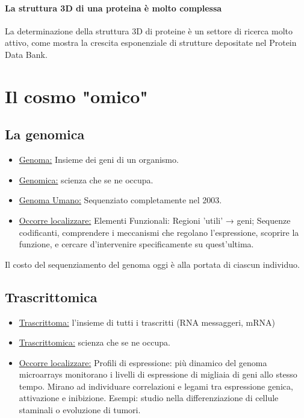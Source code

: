 \documentclass{article}
\begin{document}
\paragraph{La struttura 3D di una proteina è molto complessa} La determinazione della
struttura 3D di proteine è un settore di ricerca molto attivo,
come mostra la crescita esponenziale di strutture depositate nel Protein Data Bank.\\
\section{Il cosmo "omico"}
\subsection{La genomica} 
\begin{itemize}
    \item \underline{Genoma:} Insieme dei geni di un organismo.
    \item \underline{Genomica:} scienza che se ne
    occupa.
    \item \underline{Genoma Umano:} Sequenziato
    completamente nel 2003.
    \item \underline{Occorre localizzare:} Elementi
    Funzionali:
    \subitem{-} Regioni 'utili' → geni;
    \subitem{-} Sequenze codificanti,
    comprendere i meccanismi che
    regolano l'espressione, scoprire
    la funzione, e cercare
    d'intervenire specificamente su
    quest'ultima.
\end{itemize}
Il costo del sequenziamento del genoma oggi è alla portata di ciascun individuo.
\subsection{Trascrittomica}
\begin{itemize}
    \item \underline{Trascrittoma:} l'insieme di tutti i
    trascritti (RNA messaggeri,
    mRNA)
    \item \underline{Trascrittomica:} scienza che se ne
    occupa.
    \item \underline{Occorre localizzare:} Profili di
    espressione:
    \subitem{-} più dinamico del genoma
    \subitem{-} microarrays monitorano i
    livelli di espressione di migliaia
    di geni allo stesso tempo.
    Mirano ad individuare
    correlazioni e legami tra
    espressione genica, attivazione
    e inibizione.
    Esempi: studio nella
    differenziazione di cellule
    staminali o evoluzione di
    tumori.
\end{itemize}
\end{document}
